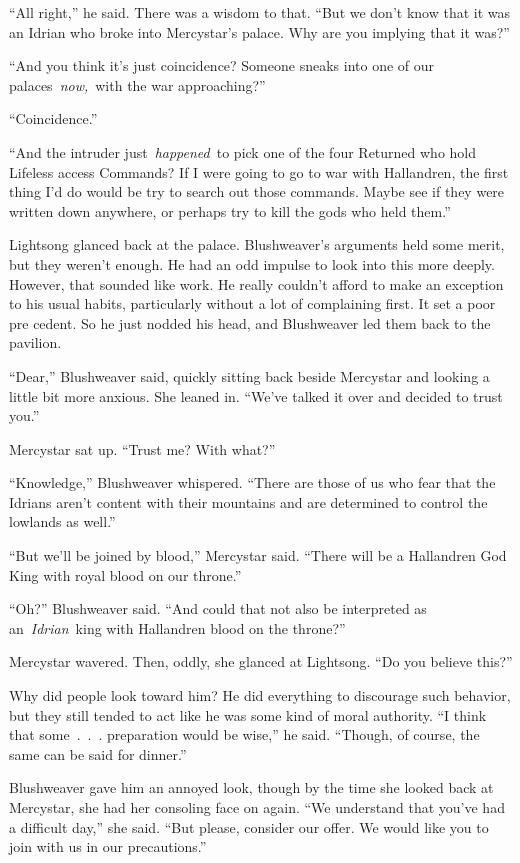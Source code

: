 “All right,” he said. There was a wisdom to that. “But we don’t know that it was an Idrian who broke into Mercystar’s palace. Why are you implying that it was?”

“And you think it’s just coincidence? Someone sneaks into one of our palaces~\textit{now,}~with the war approaching?”

“Coincidence.”

“And the intruder just~\textit{happened}~to pick one of the four Returned who hold Lifeless access Commands? If I were going to go to war with Hallandren, the first thing I’d do would be try to search out those commands. Maybe see if they were written down anywhere, or perhaps try to kill the gods who held them.”

Lightsong glanced back at the palace. Blushweaver’s arguments held some merit, but they weren’t enough. He had an odd impulse to look into this more deeply. However, that sounded like work. He really couldn’t afford to make an exception to his usual habits, particularly without a lot of complaining first. It set a poor pre cedent. So he just nodded his head, and Blushweaver led them back to the pavilion.

“Dear,” Blushweaver said, quickly sitting back beside Mercystar and looking a little bit more anxious. She leaned in. “We’ve talked it over and decided to trust you.”

Mercystar sat up. “Trust me? With what?”

“Knowledge,” Blushweaver whispered. “There are those of us who fear that the Idrians aren’t content with their mountains and are determined to control the lowlands as well.”

“But we’ll be joined by blood,” Mercystar said. “There will be a Hallandren God King with royal blood on our throne.”

“Oh?” Blushweaver said. “And could that not also be interpreted as an~\textit{Idrian}~king with Hallandren blood on the throne?”

Mercystar wavered. Then, oddly, she glanced at Lightsong. “Do you believe this?”

Why did people look toward him? He did everything to discourage such behavior, but they still tended to act like he was some kind of moral authority. “I think that some~.~.~. preparation would be wise,” he said. “Though, of course, the same can be said for dinner.”

Blushweaver gave him an annoyed look, though by the time she looked back at Mercystar, she had her consoling face on again. “We understand that you’ve had a difficult day,” she said. “But please, consider our offer. We would like you to join with us in our precautions.”

